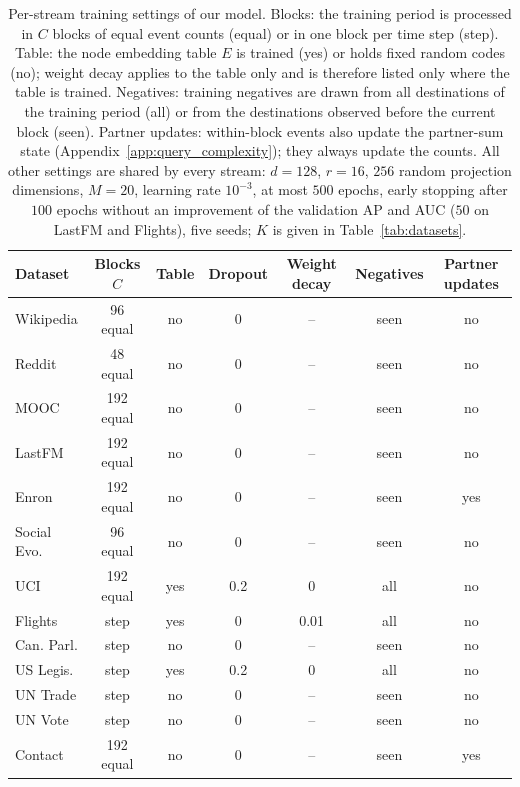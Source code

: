 \begin{table}[t]
\caption{Per-stream training settings of our model. Blocks: the training period is processed in $C$ blocks of equal event counts (equal) or in one block per time step (step). Table: the node embedding table $E$ is trained (yes) or holds fixed random codes (no); weight decay applies to the table only and is therefore listed only where the table is trained. Negatives: training negatives are drawn from all destinations of the training period (all) or from the destinations observed before the current block (seen). Partner updates: within-block events also update the partner-sum state (Appendix~\ref{app:query_complexity}); they always update the counts. All other settings are shared by every stream: $d=128$, $r=16$, $256$ random projection dimensions, $M=20$, learning rate $10^{-3}$, at most $500$ epochs, early stopping after $100$ epochs without an improvement of the validation AP and AUC ($50$ on LastFM and Flights), five seeds; $K$ is given in Table~\ref{tab:datasets}.}
\label{tab:training_settings}
\centering
\footnotesize
\setlength{\tabcolsep}{5pt}
\begin{tabular}{lcccccc}
\toprule
Dataset & Blocks $C$ & Table & Dropout & Weight decay & Negatives & Partner updates \\
\midrule
Wikipedia & 96 equal & no & 0 & -- & seen & no \\
Reddit & 48 equal & no & 0 & -- & seen & no \\
MOOC & 192 equal & no & 0 & -- & seen & no \\
LastFM & 192 equal & no & 0 & -- & seen & no \\
Enron & 192 equal & no & 0 & -- & seen & yes \\
Social Evo. & 96 equal & no & 0 & -- & seen & no \\
UCI & 192 equal & yes & 0.2 & 0 & all & no \\
Flights & step & yes & 0 & 0.01 & all & no \\
Can. Parl. & step & no & 0 & -- & seen & no \\
US Legis. & step & yes & 0.2 & 0 & all & no \\
UN Trade & step & no & 0 & -- & seen & no \\
UN Vote & step & no & 0 & -- & seen & no \\
Contact & 192 equal & no & 0 & -- & seen & yes \\
\bottomrule
\end{tabular}
\end{table}
